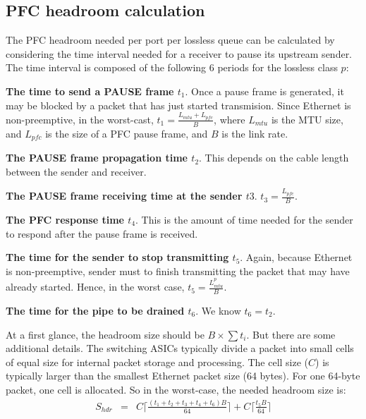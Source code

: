 \begin{appendices}
\section{PFC headroom calculation}\label{APPHEADROOM}

The PFC headroom needed per port per lossless queue can be calculated by
		considering the time interval needed for a receiver to pause its
		upstream sender. The time interval is composed of the following 6
		periods for the lossless class $p$:

	
\noindent\textbf{The time to send a PAUSE frame $t_1$}.  Once a pause frame is
		generated, it may be blocked by a packet that has just started
		transmision. Since Ethernet is non-preemptive, in the worst-cast,
		$t_1 = \frac{ L_{mtu} + L_{pfc}}{B}$, where $L_{mtu}$ is the MTU size,
		and $L_{pfc}$ is the size of a PFC pause frame, and $B$ is the link
		rate.


\noindent\textbf{The PAUSE frame propagation time $t_2$}. This depends on 
		the cable length between the sender and receiver.

\noindent\textbf{The PAUSE frame receiving time at the sender $t3$}.
		$t_3=\frac{L_{pfc}}{B}$.

\noindent\textbf{The PFC response time $t_4$}. This is the amount of time needed
		for the sender to respond after the pause frame is received.

\noindent\textbf{The time for the sender to stop transmitting $t_5$}. Again,
		because Ethernet is non-preemptive, sender must to finish 
		transmitting the packet that may have already started. Hence, in the
		worst case, $t_5 =
		\frac{L^{p}_{mtu}}{B}$.

\noindent\textbf{The time for the pipe to be drained $t_6$}. We know $t_6 =
		t_2$.


At a first glance, the headroom size should be $B\times\sum t_i$. But there are
some additional details. The switching ASICs typically divide a packet
into small cells of equal size for internal packet storage and
processing. The cell size ($C$) is typically larger than the smallest
Ethernet packet size (64 bytes). For one 64-byte packet, one cell is
allocated. So in the worst-case, the needed headroom size is:
\begin{eqnarray} \label{eqn:pfcheadroom} S_{hdr} & = &
C\lceil\frac{(t_1+t_2+t_3+t_4 + t_6)B}{64}\rceil + C\lceil \frac{t_5
B}{64}\rceil \nonumber \end{eqnarray}


\end{appendices}
